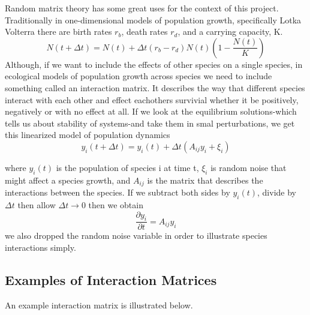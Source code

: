 \documentclass{article}
\begin{document}
Random matrix theory has some great uses for the context of this project. Traditionally in one-dimensional models of population growth, specifically Lotka Volterra there are birth rates $r_b$, death rates $r_d$, and a carrying capacity, K.  \hfill\break
\hfill\break 
$$
N(t+\Delta t)=N(t)+\Delta t (r_b-r_d)N(t)(1-\dfrac{N(t)}{K})
$$
\hfill\break \hfill\break
Although, if we want to include the effects of other species on a single species, in ecological models of population growth across species we need to include something called an interaction matrix. It describes the way that different species interact with each other and effect eachothers survivial whether it be positively, negatively or with no effect at all. If we look at the equilibrium solutions-which tells us about stability of systems-and take them in smal perturbations, we get this linearized model of population dynamics \hfill\break
\hfill\break 
\begin{equation}
y_i(t+\Delta t)=y_i(t) + \Delta t(A_{ij}y_i +\xi_i)
\end{equation}

\hfill\break
where $y_i(t)$ is the population of species i at time t, $\xi_i$ is random noise that might affect a species growth, and $A_{ij}$ is the matrix that describes the interactions between the species.
\hfill\break 
If we subtract both sides by $y_i(t)$, divide by $\Delta t$ then allow $\Delta t \rightarrow 0$ then we obtain \hfill\break
$$\dfrac{\partial y_i}{\partial t}=A_{ij}y_i$$
we also dropped the random noise variable in order to illustrate species interactions simply.
\subsection{Examples of Interaction Matrices}

An example interaction matrix is illustrated below. 
\end{document}
